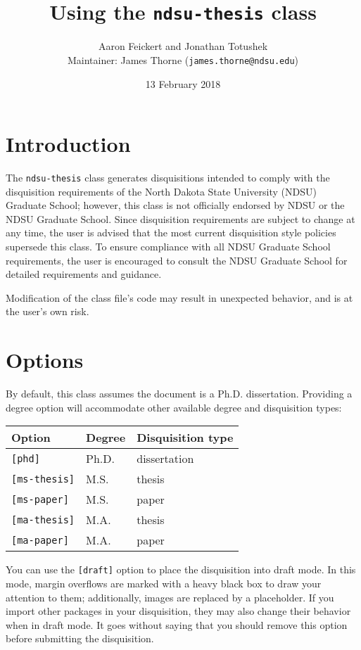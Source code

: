 \documentclass{article}
\title{Using the \texttt{ndsu-thesis} class}
\author{Aaron Feickert and Jonathan Totushek \\ Maintainer: James Thorne (\texttt{james.thorne@ndsu.edu})}
\date{13 February 2018}
\begin{document}
\maketitle

\section{Introduction}
The \texttt{ndsu-thesis} class generates disquisitions intended to comply with the disquisition requirements of the North Dakota State University (NDSU) Graduate School; however, this class is not officially endorsed by NDSU or the NDSU Graduate School. Since disquisition requirements are subject to change at any time, the user is advised that the most current disquisition style policies supersede this class. To ensure compliance with all NDSU Graduate School requirements, the user is encouraged to consult the NDSU Graduate School for detailed requirements and guidance.

Modification of the class file's code may result in unexpected behavior, and is at the user's own risk.

\section{Options}
By default, this class assumes the document is a Ph.D. dissertation. Providing a degree option will accommodate other available degree and disquisition types:
\begin{center}
\begin{tabular}{lll}
Option & Degree & Disquisition type \\
\hline
\texttt{[phd]} & Ph.D. & dissertation \\
\texttt{[ms-thesis]} & M.S. & thesis \\
\texttt{[ms-paper]} & M.S. & paper \\
\texttt{[ma-thesis]} & M.A. & thesis \\
\texttt{[ma-paper]} & M.A. & paper \\
\end{tabular}
\end{center}

You can use the \texttt{[draft]} option to place the disquisition into draft mode. In this mode, margin overflows are marked with a heavy black box to draw your attention to them; additionally, images are replaced by a placeholder. If you import other packages in your disquisition, they may also change their behavior when in draft mode. It goes without saying that you should remove this option before submitting the disquisition.
\end{document}
